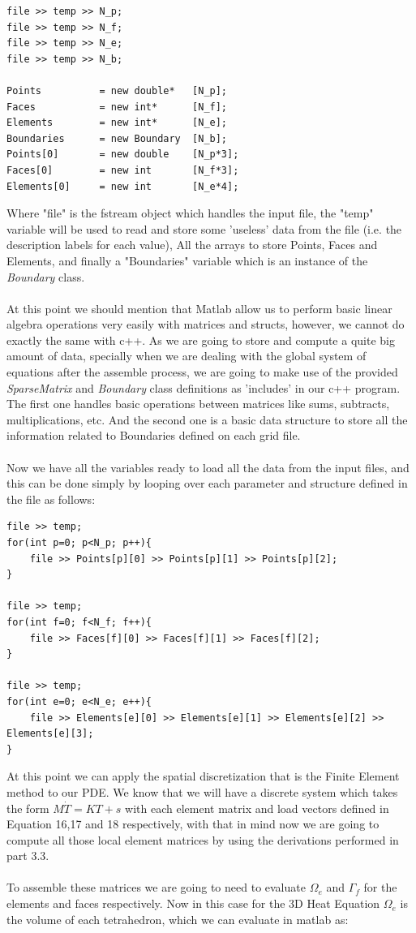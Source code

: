 \documentclass[12pt]{article}
\begin{document}
\begin{lstlisting}[style=MyC++Style]
file >> temp >> N_p;
file >> temp >> N_f;
file >> temp >> N_e;
file >> temp >> N_b;

Points			= new double*	[N_p];
Faces			= new int*		[N_f];
Elements		= new int*		[N_e];
Boundaries		= new Boundary  [N_b];
Points[0]       = new double    [N_p*3];
Faces[0]        = new int       [N_f*3];
Elements[0]     = new int       [N_e*4];
\end{lstlisting}

Where "file" is the fstream object which handles the input file, the "temp" variable will be used to read and store some 'useless' data from the file (i.e. the description labels for each value), All the arrays to store Points, Faces and Elements, and finally a "Boundaries" variable which is an instance of the \textit{Boundary} class. 
\\\\
At this point we should mention that Matlab allow us to perform basic linear algebra operations very easily with matrices and structs, however, we cannot do exactly the same with c++. As we are going to store and compute a quite big amount of data, specially when we are dealing with the global system of equations after the assemble process, we are going to make use of the provided \textit{SparseMatrix} and \textit{Boundary} class definitions as 'includes' in our c++ program. The first one handles basic operations between matrices like sums, subtracts, multiplications, etc. And the second one is a basic data structure to store all the information related to Boundaries defined on each grid file. 
\\\\
Now we have all the variables ready to load all the data from the input files, and this can be done simply by looping over each parameter and structure defined in the file as follows:

\begin{lstlisting}[style=MyC++Style]
file >> temp;
for(int p=0; p<N_p; p++){
	file >> Points[p][0] >> Points[p][1] >> Points[p][2];
}

file >> temp;
for(int f=0; f<N_f; f++){
	file >> Faces[f][0] >> Faces[f][1] >> Faces[f][2];
}

file >> temp;
for(int e=0; e<N_e; e++){
	file >> Elements[e][0] >> Elements[e][1] >> Elements[e][2] >> Elements[e][3];
}
\end{lstlisting}

At this point we can apply the spatial discretization that is the Finite Element method to our PDE. We know that we will have a discrete system which takes the form $M\dot{T} = KT + s$ with each element matrix and load vectors defined in Equation 16,17 and 18 respectively, with that in mind now we are going to compute all those local element matrices by using the derivations performed in part 3.3.
\\\\
To assemble these matrices we are going to need to evaluate $\Omega_e$ and $\Gamma_f$ for the elements and faces respectively. Now in this case for the 3D Heat Equation $\Omega_e$ is the volume of each tetrahedron, which we can evaluate in matlab as:
\end{document}
